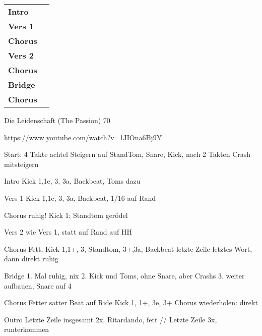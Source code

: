 
\begin{tabular}{p{1.6cm}l}
	\textbf{Intro}  & \\
	\textbf{Vers 1} & \\
	\textbf{Chorus} & \\
	\textbf{Vers 2} & \\
	\textbf{Chorus} & \\
	\textbf{Bridge} & \\
	\textbf{Chorus} & \\
\end{tabular}

Die Leidenschaft (The Passion)						70

https://www.youtube.com/watch?v=1JIOna6Bj9Y

Start:	4 Takte achtel Steigern auf StandTom, Snare, Kick, nach 2 Takten Crash mitsteigern

Intro		Kick 1,1e, 3, 3a, Backbeat, Toms dazu

Vers 1		Kick 1,1e, 3, 3a, Backbeat, 1/16 auf Rand

Chorus	ruhig! Kick 1; Standtom gerödel

Vers 2		wie Vers 1, statt auf Rand auf HH

Chorus	Fett, Kick 1,1+, 3, Standtom, 3+,3a, Backbeat
		letzte Zeile letztes Wort, dann direkt ruhig

Bridge	1. Mal ruhig, nix
		2. Kick und Toms, ohne Snare, aber Crashs
		3. weiter aufbauen, Snare auf 4

Chorus	Fetter satter Beat auf Ride
		Kick 1, 1+, 3e, 3+
		Chorus wiederholen: direkt

Outro		Letzte Zeile insgesamt 2x, Ritardando, fett //
		Letzte Zeile 3x, runterkommen
